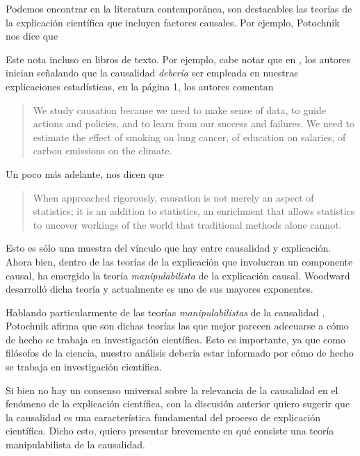 Podemos encontrar en la literatura contemporánea, son destacables
las teorías de la explicación científica que incluyen factores
causales. Por ejemplo, Potochnik nos dice que  \parencite[][p.~24]{Potochnik2017-POTIAT-3}

Este  nota incluso en libros de texto. Por ejemplo, cabe notar que en \cite{Pearl2016}, los autores inician señalando que la causalidad \emph{debería} ser empleada en nuestras explicaciones estadísticas, en la página 1, los autores comentan

\begin{quote}
	We study causation because we need to make sense of data, to
	guide actions and policies, and to learn from our success and
	failures. We need to estimate the effect of smoking on lung
	cancer, of education on salaries, of carbon emissions on the
	climate.
\end{quote}

Un poco más adelante, nos dicen que

\begin{quote}
	When approached rigorously, causation is not merely an aspect of
	statistics; it is an addition to statistics, an enrichment that
	allows statistics to uncover workings of the world that
	traditional methods alone cannot.
\end{quote}

Esto es sólo una muestra del vínculo que hay entre causalidad y
explicación. Ahora bien, dentro de las teorías de la explicación que
involucran un componente causal, ha emergido la teoría
\emph{manipulabilista} de la explicación causal. Woodward desarrolló
dicha teoría y actualmente es uno de sus mayores exponentes.

Hablando particularmente de las teorías \emph{manipulabilistas} de
la causalidad \parencite{sep-causation-mani}, Potochnik afirma que
son dichas teorías las que mejor parecen adecuarse a cómo de hecho
se trabaja en investigación científica. Esto es importante, ya que
como filósofos de la ciencia, nuestro análisis debería estar
informado por cómo de hecho se trabaja en investigación
científica.

Si bien no hay un consenso universal sobre la relevancia de la
causalidad en el fenómeno de la explicación científica, con la
discusión anterior quiero sugerir que la causalidad es una
característica fundamental del proceso de explicación científica.
Dicho esto, quiero presentar brevemente en qué consiste una teoría
manipulabilista de la causalidad.

